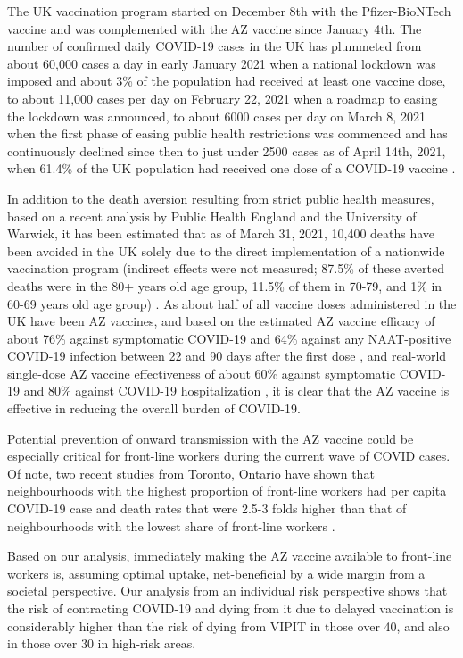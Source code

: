 \documentclass[]{interact}
\theoremstyle{plain}%
\theoremstyle{definition}
\theoremstyle{remark}
\begin{document}
The UK vaccination program started on December 8th with the
Pfizer-BioNTech vaccine and was complemented with the AZ vaccine since
January 4th. The number of confirmed daily COVID-19 cases in the UK has
plummeted from about 60,000 cases a day in early January 2021 when a
national lockdown was imposed and about 3\% of the population had
received at least one vaccine dose, to about 11,000 cases per day on
February 22, 2021 when a roadmap to easing the lockdown was announced,
to about 6000 cases per day on March 8, 2021 when the first phase of
easing public health restrictions was commenced
\citep{bbc_lockdown_2021} and has continuously declined since then to
just under 2500 cases as of April 14th, 2021, when 61.4\% of the UK
population had received one dose of a COVID-19 vaccine
\citep{govuk_official_2021}.

In addition to the death aversion resulting from strict public health
measures, based on a recent analysis by Public Health England and the
University of Warwick, it has been estimated that as of March 31, 2021,
10,400 deaths have been avoided in the UK solely due to the direct
implementation of a nationwide vaccination program (indirect effects
were not measured; 87.5\% of these averted deaths were in the 80+ years
old age group, 11.5\% of them in 70-79, and 1\% in 60-69 years old age
group) \citep{public_health_england_impact_2021}. As about half of all
vaccine doses administered in the UK have been AZ vaccines, and based on
the estimated AZ vaccine efficacy of about 76\% against symptomatic
COVID-19 and 64\% against any NAAT-positive COVID-19 infection between
22 and 90 days after the first dose \citep{voysey_single-dose_2021}, and
real-world single-dose AZ vaccine effectiveness of about 60\% against
symptomatic COVID-19 and 80\% against COVID-19 hospitalization
\citep{public_health_england_1public_2021}, it is clear that the AZ
vaccine is effective in reducing the overall burden of COVID-19.

Potential prevention of onward transmission with the AZ vaccine could be
especially critical for front-line workers during the current wave of
COVID cases. Of note, two recent studies from Toronto, Ontario have
shown that neighbourhoods with the highest proportion of front-line
workers had per capita COVID-19 case and death rates that were 2.5-3
folds higher than that of neighbourhoods with the lowest share of
front-line workers
\citep[\citet{rao_disproportionate_2021}]{chagla_characterizing_2021}.

Based on our analysis, immediately making the AZ vaccine available to
front-line workers is, assuming optimal uptake, net-beneficial by a wide
margin from a societal perspective. Our analysis from an individual risk
perspective shows that the risk of contracting COVID-19 and dying from
it due to delayed vaccination is considerably higher than the risk of
dying from VIPIT in those over 40, and also in those over 30 in
high-risk areas.
\end{document}
